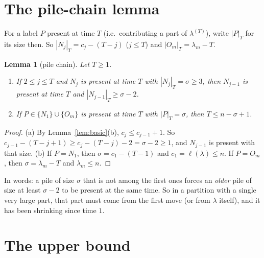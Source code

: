 \documentclass[11pt]{article}
\newtheorem{lemma}[theorem]{Lemma}
\theoremstyle{definition}
\renewcommand{\le}{\leqslant}
\renewcommand{\ge}{\geqslant}
\begin{document}
\section{The pile-chain lemma}\label{sec:chain}

For a label $P$ present at time $T$ (i.e.\ contributing a part of $\lambda^{(T)}$), write $|P|_T$ for its size then.  So
$|N_j|_T=c_j-(T-j)$ ($j\le T$) and $|O_m|_T=\lambda_m-T$.

\begin{lemma}[pile chain]\label{lem:chain}
Let $T\ge1$.
\begin{enumerate}
\item[(a)] If $2\le j\le T$ and $N_j$ is present at time $T$ with $|N_j|_T=\sigma\ge3$, then $N_{j-1}$ is present at time $T$ and
$|N_{j-1}|_T\ge\sigma-2$.
\item[(b)] If $P\in\{N_1\}\cup\{O_m\}$ is present at time $T$ with $|P|_T=\sigma$, then $T\le n-\sigma+1$.
\end{enumerate}
\end{lemma}
\begin{proof}
(a) By Lemma~\ref{lem:basic}(b), $c_j\le c_{j-1}+1$.  So $c_{j-1}-(T-j+1)\ge c_j-(T-j)-2=\sigma-2\ge1$, and
$N_{j-1}$ is present with that size.  (b) If $P=N_1$, then $\sigma=c_1-(T-1)$ and $c_1=\ell(\lambda)\le n$.  If $P=O_m$,
then $\sigma=\lambda_m-T$ and $\lambda_m\le n$.
\end{proof}

In words: a pile of size $\sigma$ that is not among the first ones forces an \emph{older} pile of size at least
$\sigma-2$ to be present at the same time.  So in a partition with a single very large part, that part must come from
the first move (or from $\lambda$ itself), and it has been shrinking since time $1$.

\section{The upper bound}\label{sec:c5upper}
\end{document}
